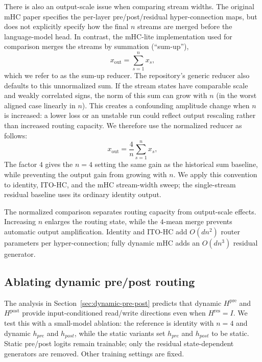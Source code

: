 \documentclass{article}
\newcommand{\Hpre}{H^{\mathrm{pre}}}
\newcommand{\Hpost}{H^{\mathrm{post}}}
\newcommand{\Hres}{H^{\mathrm{res}}}
\begin{document}
There is also an output-scale issue when comparing stream widths. The original mHC paper specifies the per-layer pre/post/residual hyper-connection maps, but does not explicitly specify how the final $n$ streams are merged before the language-model head. In contrast, the mHC-lite implementation used for comparison merges the streams by summation (``sum-up''),
\begin{equation}
 x_{\mathrm{out}}=\sum_{s=1}^{n}x_s,
 \label{eq:sum-reducer}
\end{equation}
which we refer to as the sum-up reducer. The repository's generic reducer also defaults to this unnormalized sum. If the stream states have comparable scale and weakly correlated signs, the norm of this sum can grow with $n$ (in the worst aligned case linearly in $n$). This creates a confounding amplitude change when $n$ is increased: a lower loss or an unstable run could reflect output rescaling rather than increased routing capacity. We therefore use the normalized reducer as follows:
\begin{equation}
 x_{\mathrm{out}}=\frac{4}{n}\sum_{s=1}^{n}x_s,
 \label{eq:four-mean-reducer}
\end{equation}
 The factor $4$ gives the $n=4$ setting the same gain as the historical sum baseline, while preventing the output gain from growing with $n$. We apply this convention to identity, ITO-HC, and the mHC stream-width sweep; the single-stream residual baseline uses its ordinary identity output.

The normalized comparison separates routing capacity from output-scale effects. Increasing $n$ enlarges the routing state, while the $4$-mean merge prevents automatic output amplification. Identity and ITO-HC add $O(dn^2)$ router parameters per hyper-connection; fully dynamic mHC adds an $O(dn^3)$ residual generator.

\subsection{Ablating dynamic pre/post routing}
\label{sec:dynamic-pre-post-ablation}

The analysis in Section~\ref{sec:dynamic-pre-post} predicts that dynamic $\Hpre$ and $\Hpost$ provide input-conditioned read/write directions even when $\Hres=I$. We test this with a small-model ablation: the reference is identity with $n=4$ and dynamic $h_{pre}$ and $h_{post}$, while the static variants set $h_{pre}$ and $h_{post}$ to be static. Static pre/post logits remain trainable; only the residual state-dependent generators are removed. Other training settings are fixed.
\end{document}
